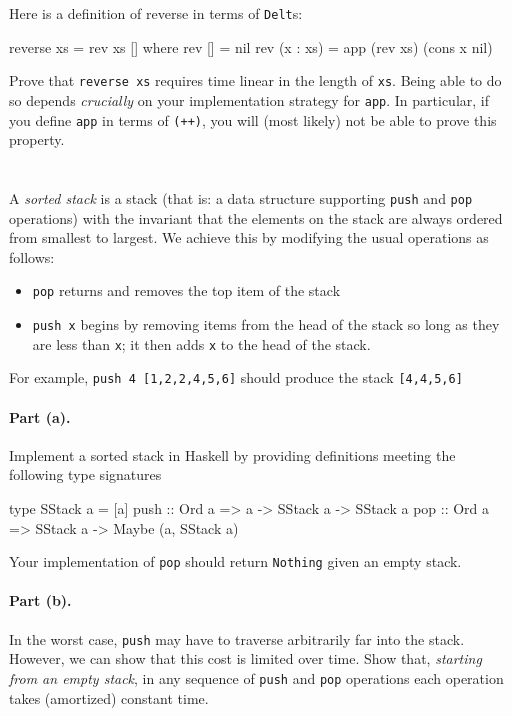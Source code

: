 \documentclass{article}
\newcommand{\Problem}[1][]{\ifthenelse{\equal{#1}{}}{}{\addtocounter{section}{#1}}\clearpage\section{}\setcounter{page}{1}}
\begin{document}
Here is a definition of reverse in terms of \lstinline|Delt|s:
\begin{code}
reverse xs = rev xs []
    where rev [] = nil
          rev (x : xs) = app (rev xs) (cons x nil)
\end{code}
Prove that \lstinline|reverse xs| requires time linear in the length of \lstinline|xs|.  Being able to do so depends \emph{crucially} on your implementation strategy for \lstinline!app!.  In particular, if you define \lstinline|app| in terms of \lstinline|(++)|, you will (most likely) not be able to prove this property.

\Problem

A \emph{sorted stack} is a stack (that is: a data structure supporting \lstinline|push| and \lstinline|pop| operations) with the invariant that the elements on the stack are always ordered from smallest to largest.  We achieve this by modifying the usual operations as follows:
\begin{itemize}
\item \lstinline|pop| returns and removes the top item of the stack
\item \lstinline|push x| begins by removing items from the head of the stack so long as they are less than \lstinline|x|; it then adds \lstinline|x| to the head of the stack.
\end{itemize}
For example, \lstinline|push 4 [1,2,2,4,5,6]| should produce the stack \lstinline|[4,4,5,6]|

\paragraph{Part (a).}

Implement a sorted stack in Haskell by providing definitions meeting the following type signatures
\begin{code}
type SStack a = [a]
push :: Ord a => a -> SStack a -> SStack a
pop  :: Ord a => SStack a -> Maybe (a, SStack a)
\end{code}
Your implementation of \lstinline|pop| should return \lstinline|Nothing| given an empty stack.

\paragraph{Part (b).}

In the worst case, \lstinline|push| may have to traverse arbitrarily far into the stack.  However, we can show that this cost is limited over time.  Show that, \emph{starting from an empty stack}, in any sequence of \lstinline|push| and \lstinline|pop| operations each operation takes (amortized) constant time.
\end{document}
